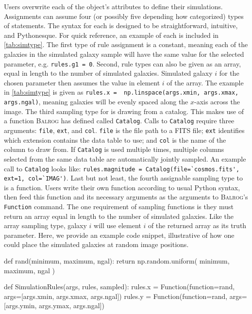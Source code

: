 \documentclass[12pt]{book}
\newcommand{\codett}[1]{\lstinline{#1}}
\newcommand{\py}{Python}
\newcommand{\balrog}{\textsc{Balrog}}
\begin{document}
Users overwrite
each of the \simrules{} object's attributes to define their simulations.
Assignments can assume four (or possibly five depending how categorized) types of statements. 
The syntax for each is designed to be straightforward, intuitive, and \py{}esque.
For quick reference, an example of each is included in \autoref{tab:simtype}.
The first type of rule assignment is a constant, meaning each of the galaxies in the simulated galaxy sample
will have the same value for the selected parameter, e.g. \codett{rules.g1 = 0}.
Second, rule types can also be given as an array, equal in length to the number of simulated galaxies. 
Simulated galaxy $i$ for the chosen parameter then assumes the value in element $i$ of the array.
The example in \autoref{tab:simtype} is given as \codett{rules.x =  np.linspace(args.xmin, args.xmax, args.ngal)},
meaning galaxies will be evenly spaced along the $x$-axis across the image.
The third sampling type for \simrules{} is drawing from a catalog. 
This makes use of a function \balrog{} has defined called \codett{Catalog}. 
Calls to \codett{Catalog} require three arguments: \codett{file}, \codett{ext}, and \codett{col}.
\codett{file} is the file path to a FITS file;
\codett{ext} identifies which extension contains the data table to use; and
\codett{col} is the name of the column to draw from.
If \codett{Catalog} is used multiple times,
multiple columns selected from the same data table are automatically jointly sampled.
An example call to \codett{Catalog} looks like: 
\codett{rules.magnitude = Catalog(file=`cosmos.fits', ext=1, col=`IMAG')}.
Last but not least, the fourth assignable sampling type to \simrules{} is a function. 
Users write their own function according to usual \py{} syntax,
then feed this function and its necessary arguments as the arguments to
\balrog{}'s \codett{Function} command. 
The one requirement of sampling functions is they must return an array equal in 
length to the number of simulated galaxies.
Like the array sampling type, galaxy $i$ will use element $i$ of the returned array as its truth parameter.
Here, we provide an example code snippet, illustrative of how one could place the simulated galaxies at random image positions. 

\begin{code}
def rand(minimum, maximum, ngal):
    return np.random.uniform( minimum, maximum, ngal )

def SimulationRules(args, rules, sampled):
    rules.x = Function(function=rand, args=[args.xmin, args.xmax, args.ngal])
    rules.y = Function(function=rand, args=[args.ymin, args.ymax, args.ngal])
\end{code}
\end{document}
